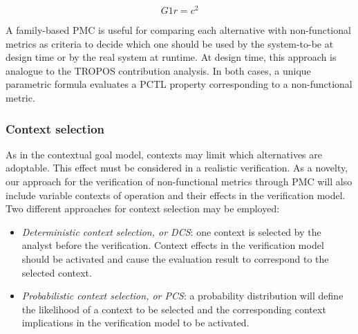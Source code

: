 \begin{equation}
G1r=c^2\label{eq:MPERS_RELIABILITY_FORM}
\end{equation}

A family-based PMC is useful for comparing each alternative with non-functional metrics as criteria to decide which one should be used by the system-to-be at design time or by the real system at runtime. At design time, this approach is analogue to the TROPOS contribution analysis. In both cases, a unique parametric formula evaluates a PCTL property corresponding to a non-functional metric.  %




\subsubsection{Context selection}

As in the contextual goal model, contexts may limit which alternatives are adoptable. This effect must be considered in a realistic verification. As a novelty, our approach for the verification of non-functional metrics through PMC will also include variable contexts of operation and their effects in the verification model. Two different approaches for context selection may be employed: 

\begin{itemize}

\item \textit{Deterministic context selection, or DCS}: one context is selected by the analyst before the verification. Context effects in the verification model should be activated and cause the evaluation result to correspond to the selected context.
\medskip

\item \textit{Probabilistic context selection, or PCS}: a probability distribution will define the likelihood of a context to be selected and the corresponding context implications in the verification model to be activated.  

\end{itemize}

